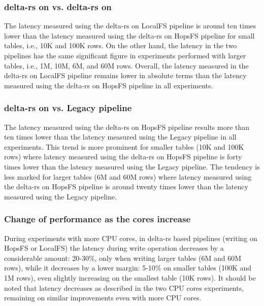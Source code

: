 \subsubsection*{delta-rs on  vs. delta-rs on }

The latency measured using the delta-rs on \gls{LocalFS} pipeline is around ten times lower than the latency measured using the delta-rs on \gls{HopsFS} pipeline for small tables, i.e., 10K and 100K rows. On the other hand, the latency in the two pipelines has the same significant figure in experiments performed with larger tables, i.e., 1M, 10M, 6M, and 60M rows. Overall, the latency measured in the delta-rs on \gls{LocalFS} pipeline remains lower in absolute terms than the latency measured using the delta-rs on \gls{HopsFS} pipeline in all experiments.

\subsubsection*{delta-rs on  vs. Legacy pipeline}

The latency measured using the delta-rs on \gls{HopsFS} pipeline results more than ten times lower than the latency measured using the Legacy pipeline in all experiments. This trend is more prominent for smaller tables (10K and 100K rows) where latency measured using the delta-rs on \gls{HopsFS} pipeline is forty times lower than the latency measured using the Legacy pipeline. The tendency is less marked for larger tables (6M and 60M rows) where latency measured using the delta-rs on \gls{HopsFS} pipeline is around twenty times lower than the latency measured using the Legacy pipeline.

\subsubsection*{Change of performance as the  cores increase}

During experiments with more \gls{CPU} cores, in delta-rs based pipelines (writing on \gls{HopsFS} or \gls{LocalFS}) the latency during write operation decreases by a considerable amount: 20-30\%, only when writing larger tables (6M and 60M rows), while it decreases by a lower margin: 5-10\% on smaller tables (100K and 1M rows), even slightly increasing on the smallest table (10K rows). It should be noted that latency decreases as described in the two \gls{CPU} cores experiments, remaining on similar improvements even with more \gls{CPU} cores.

